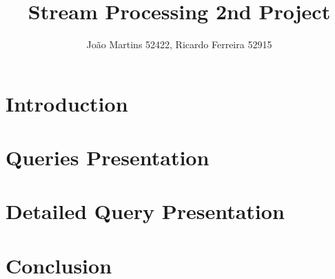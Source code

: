 \documentclass[runningheads]{llncs}
\begin{document}
\title{Stream Processing 2nd Project}
%
%
\author{João Martins 52422, Ricardo Ferreira 52915}

%
\maketitle              %
%
\vspace{-0.6cm}

\section{Introduction}


\section{Queries Presentation}


\section{Detailed Query Presentation}


\section{Conclusion}





\end{document}
